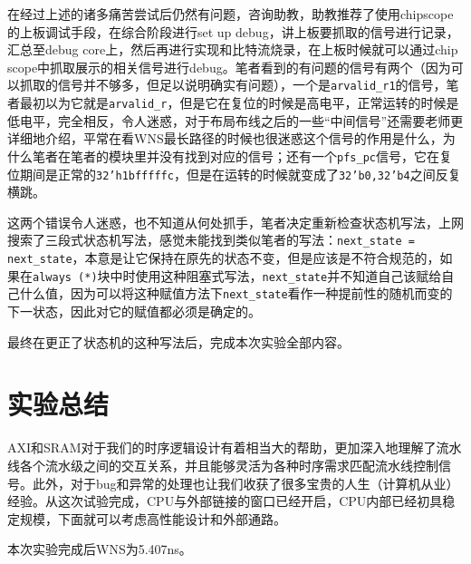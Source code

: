 \documentclass[UTF-8,twoside,c5size]{ctexart}
\begin{document}
    在经过上述的诸多痛苦尝试后仍然有问题，咨询助教，助教推荐了使用chipscope的上板调试手段，在综合阶段进行set up debug，讲上板要抓取的信号进行记录，汇总至debug core上，然后再进行实现和比特流烧录，在上板时候就可以通过chip scope中抓取展示的相关信号进行debug。笔者看到的有问题的信号有两个（因为可以抓取的信号并不够多，但足以说明确实有问题），一个是\texttt{arvalid_r1}的信号，笔者最初以为它就是\texttt{arvalid_r}，但是它在复位的时候是高电平，正常运转的时候是低电平，完全相反，令人迷惑，对于布局布线之后的一些“中间信号”还需要老师更详细地介绍，平常在看WNS最长路径的时候也很迷惑这个信号的作用是什么，为什么笔者在笔者的模块里并没有找到对应的信号；还有一个\texttt{pfs_pc}信号，它在复位期间是正常的\texttt{32'h1bfffffc}，但是在运转的时候就变成了\texttt{32'b0,32'b4}之间反复横跳。
    
    这两个错误令人迷惑，也不知道从何处抓手，笔者决定重新检查状态机写法，上网搜索了三段式状态机写法，感觉未能找到类似笔者的写法：\texttt{next_state = next_state}，本意是让它保持在原先的状态不变，但是应该是不符合规范的，如果在\texttt{always (*)}块中时使用这种阻塞式写法，\texttt{next_state}并不知道自己该赋给自己什么值，因为可以将这种赋值方法下\texttt{next_state}看作一种提前性的随机而变的下一状态，因此对它的赋值都必须是确定的。
    
    最终在更正了状态机的这种写法后，完成本次实验全部内容。
	
	\section{实验总结}
	
	AXI和SRAM对于我们的时序逻辑设计有着相当大的帮助，更加深入地理解了流水线各个流水级之间的交互关系，并且能够灵活为各种时序需求匹配流水线控制信号。此外，对于bug和异常的处理也让我们收获了很多宝贵的人生（计算机从业）经验。从这次试验完成，CPU与外部链接的窗口已经开启，CPU内部已经初具稳定规模，下面就可以考虑高性能设计和外部通路。
    
    本次实验完成后WNS为5.407ns。
	
\end{document}
